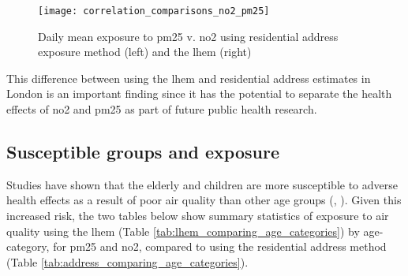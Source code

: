 \begin{figure}[H]
\centering
\texttt{[image: correlation\_comparisons\_no2\_pm25]}
\caption{Daily mean exposure to \gls{pm25} v. \gls{no2} using residential address exposure method (left) and the \gls{lhem} (right)}
\label{fig:correlation_comparisons_no2_pm25}
\end{figure}

This difference between using the \gls{lhem} and residential address estimates in London is an important finding since it has the potential to separate the health effects of \gls{no2} and \gls{pm25} as part of future public health research.

\subsection{Susceptible groups and exposure}
\label{subsec:susceptible_groups}

Studies have shown that the elderly and children are more susceptible to adverse health effects as a result of poor air quality than other age groups (\cite{Wang2015}, \cite{WorldHealthOrganization2013a}). Given this increased risk, the two tables below show summary statistics of exposure to air quality using the \gls{lhem} (Table \ref{tab:lhem_comparing_age_categories}) by age-category, for \gls{pm25} and \gls{no2}, compared to using the residential address method (Table \ref{tab:address_comparing_age_categories}).

